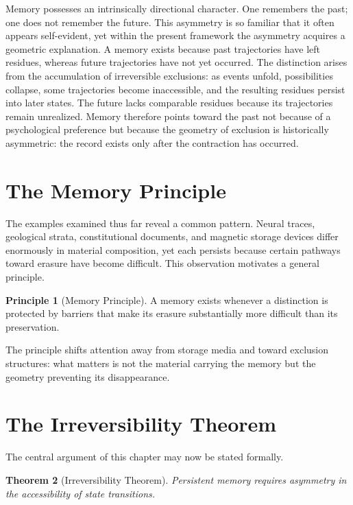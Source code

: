 \documentclass[11pt,oneside]{book}
\theoremstyle{plain}
\newtheorem{theorem}{Theorem}[chapter]
\theoremstyle{definition}
\newtheorem{principle}[theorem]{Principle}
\theoremstyle{remark}
\begin{document}
Memory possesses an intrinsically directional character. One remembers the past; one does not remember the future. This asymmetry is so familiar that it often appears self-evident, yet within the present framework the asymmetry acquires a geometric explanation. A memory exists because past trajectories have left residues, whereas future trajectories have not yet occurred. The distinction arises from the accumulation of irreversible exclusions: as events unfold, possibilities collapse, some trajectories become inaccessible, and the resulting residues persist into later states. The future lacks comparable residues because its trajectories remain unrealized. Memory therefore points toward the past not because of a psychological preference but because the geometry of exclusion is historically asymmetric: the record exists only after the contraction has occurred.

\section{The Memory Principle}

The examples examined thus far reveal a common pattern. Neural traces, geological strata, constitutional documents, and magnetic storage devices differ enormously in material composition, yet each persists because certain pathways toward erasure have become difficult. This observation motivates a general principle.

\begin{principle}[Memory Principle]
A memory exists whenever a distinction is protected by barriers that make its erasure substantially more difficult than its preservation.
\end{principle}

The principle shifts attention away from storage media and toward exclusion structures: what matters is not the material carrying the memory but the geometry preventing its disappearance.

\section{The Irreversibility Theorem}

The central argument of this chapter may now be stated formally.

\begin{theorem}[Irreversibility Theorem]
Persistent memory requires asymmetry in the accessibility of state transitions.
\end{theorem}
\end{document}
